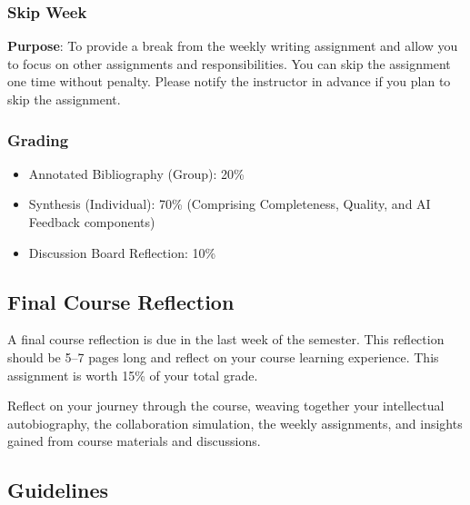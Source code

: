 \documentclass[12pt, letterpaper]{article}
\begin{document}
\subsubsection{Skip Week}
\textbf{Purpose}: To provide a break from the weekly writing assignment and allow you to focus on other assignments and responsibilities. You can skip the assignment one time without penalty. Please notify the instructor in advance if you plan to skip the assignment.

\subsubsection{Grading}
\begin{itemize}
    \item Annotated Bibliography (Group): 20\%
    \item Synthesis (Individual): 70\% (Comprising Completeness, Quality, and AI Feedback components)
    \item Discussion Board Reflection: 10\%
\end{itemize}

\subsection{Final Course Reflection}

A final course reflection is due in the last week of the semester. This reflection should be 5–7 pages long and reflect on your course learning experience. This assignment is worth 15\% of your total grade. 

Reflect on your journey through the course, weaving together your intellectual autobiography, the collaboration simulation, the weekly assignments, and insights gained from course materials and discussions.

\subsection*{Guidelines}
\end{document}
